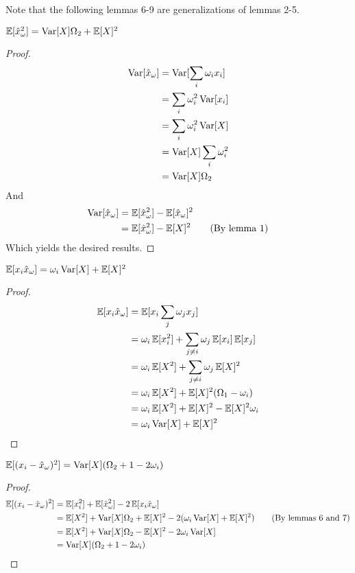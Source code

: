 \documentclass[11pt]{hw-template}
\begin{document}
    Note that the following lemmas 6-9 are generalizations of lemmas 2-5.

    \begin{lemma}
      $\operatorname{\mathbb{E}}[\hat{x}_\omega^2] = \operatorname{Var}[X]\Omega_2 + \operatorname{\mathbb{E}}[X]^2$
    \end{lemma}
    \begin{proof}
      \begin{align*}
        \operatorname{Var}[\hat{x}_\omega] 
        &= \operatorname{Var}[\sum_i \omega_i x_i]\\
        &= \sum_i \omega_i^2 \operatorname{Var}[x_i]\\
        &= \sum_i \omega_i^2 \operatorname{Var}[X]\\
        &= \operatorname{Var}[X] \sum_i \omega_i^2 \\
        &= \operatorname{Var}[X] \Omega_2
      \end{align*}
      And
      \begin{align*}
        \operatorname{Var}[\hat{x}_\omega] 
        &= \operatorname{\mathbb{E}}[\hat{x}_\omega^2] - \operatorname{\mathbb{E}}[\hat{x}_\omega]^2\\
        &= \operatorname{\mathbb{E}}[\hat{x}_\omega^2] - \operatorname{\mathbb{E}}[X]^2 \tag{By lemma 1}
      \end{align*}
      Which yields the desired results.
    \end{proof}

    \begin{lemma}
      $\operatorname{\mathbb{E}}[x_i\hat{x}_\omega] = \omega_i \operatorname{Var}[X] + \operatorname{\mathbb{E}}[X]^2$
    \end{lemma}
    \begin{proof}
      \begin{align*}
        \operatorname{\mathbb{E}}[x_i\hat{x}_\omega] 
        &= \operatorname{\mathbb{E}}[x_i\sum_j \omega_j x_j]\\
        &= \omega_i\operatorname{\mathbb{E}}[x_i^2] + \sum_{j \neq i} \omega_j\operatorname{\mathbb{E}}[x_i]\operatorname{\mathbb{E}}[x_j]\\
        &= \omega_i\operatorname{\mathbb{E}}[X^2] + \sum_{j \neq i} \omega_j\operatorname{\mathbb{E}}[X]^2\\
        &= \omega_i\operatorname{\mathbb{E}}[X^2] + \operatorname{\mathbb{E}}[X]^2 (\Omega_1 - \omega_i)\\
        &= \omega_i\operatorname{\mathbb{E}}[X^2] + \operatorname{\mathbb{E}}[X]^2 - \operatorname{\mathbb{E}}[X]^2\omega_i\\
        &= \omega_i\operatorname{Var}[X] + \operatorname{\mathbb{E}}[X]^2
      \end{align*}
    \end{proof}

    \begin{lemma}
      $\operatorname{\mathbb{E}}[(x_i - \hat{x}_\omega)^2] = \operatorname{Var}[X] (\Omega_2 + 1 - 2\omega_i)$
    \end{lemma}
    \begin{proof}
      \begin{align*}
        \operatorname{\mathbb{E}}[(x_i - \hat{x}_\omega)^2] 
        &= \operatorname{\mathbb{E}}[x_i^2] + \operatorname{\mathbb{E}}[\hat{x}_\omega^2] -2\operatorname{\mathbb{E}}[x_i\hat{x}_\omega]\\
        &= \operatorname{\mathbb{E}}[X^2] + \operatorname{Var}[X]\Omega_2 + \operatorname{\mathbb{E}}[X]^2 - 2(\omega_i \operatorname{Var}[X] + \operatorname{\mathbb{E}}[X]^2) \tag{By lemmas 6 and 7}\\
        &= \operatorname{\mathbb{E}}[X^2] + \operatorname{Var}[X]\Omega_2 - \operatorname{\mathbb{E}}[X]^2 - 2\omega_i \operatorname{Var}[X] \\
        &= \operatorname{Var}[X] (\Omega_2 + 1 - 2\omega_i)
      \end{align*}
    \end{proof}
\end{document}
